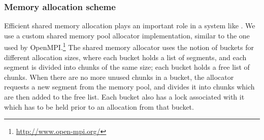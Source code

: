 
\subsubsection{Memory allocation scheme}  

Efficient shared memory allocation plays an important role in a system
like \nx.  We use a custom shared memory pool allocator
implementation, similar to the one used by
OpenMPI.\footnote{\url{http://www.open-mpi.org/}} The shared memory
allocator uses the notion of buckets for different allocation sizes,
where each bucket holds a list of segments, and each segment is
divided into chunks of the same size; each bucket holds a free list of
chunks.  When there are no more unused chunks in a bucket, the
allocator requests a new segment from the memory pool, and divides it
into chunks which are then added to the free list. Each bucket also
has a lock associated with it which has to be held prior to an
allocation from that bucket. 



